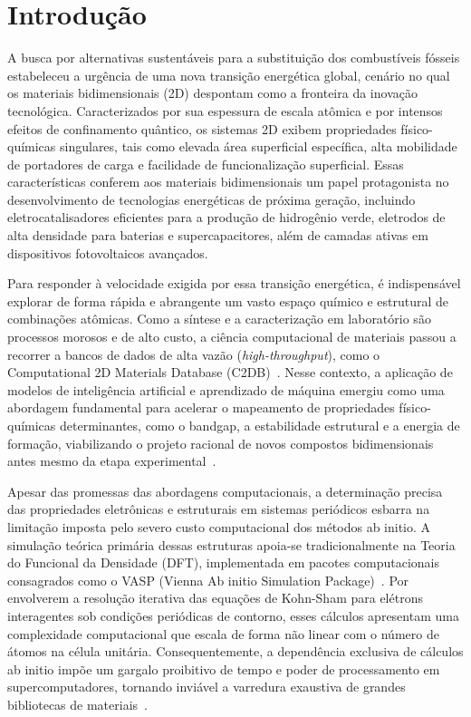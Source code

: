 \chapter{Introdução}



A busca por alternativas sustentáveis para a substituição dos combustíveis fósseis estabeleceu a urgência de uma nova transição energética global, cenário no qual os materiais bidimensionais (2D) despontam como a fronteira da inovação tecnológica. Caracterizados por sua espessura de escala atômica e por intensos efeitos de confinamento quântico, os sistemas 2D exibem propriedades físico-químicas singulares, tais como elevada área superficial específica, alta mobilidade de portadores de carga e facilidade de funcionalização superficial. Essas características conferem aos materiais bidimensionais um papel protagonista no desenvolvimento de tecnologias energéticas de próxima geração, incluindo eletrocatalisadores eficientes para a produção de hidrogênio verde, eletrodos de alta densidade para baterias e supercapacitores, além de camadas ativas em dispositivos fotovoltaicos avançados.

Para responder à velocidade exigida por essa transição energética, é indispensável explorar de forma rápida e abrangente um vasto espaço químico e estrutural de combinações atômicas. Como a síntese e a caracterização em laboratório são processos morosos e de alto custo, a ciência computacional de materiais passou a recorrer a bancos de dados de alta vazão (\textit{high-throughput}), como o Computational 2D Materials Database (C2DB)~\cite{haastrup2018computational}. Nesse contexto, a aplicação de modelos de inteligência artificial e aprendizado de máquina emergiu como uma abordagem fundamental para acelerar o mapeamento de propriedades físico-químicas determinantes, como o bandgap, a estabilidade estrutural e a energia de formação, viabilizando o projeto racional de novos compostos bidimensionais antes mesmo da etapa experimental~\cite{van2026survey}.

Apesar das promessas das abordagens computacionais, a determinação precisa das propriedades eletrônicas e estruturais em sistemas periódicos esbarra na limitação imposta pelo severo custo computacional dos métodos ab initio. A simulação teórica primária dessas estruturas apoia-se tradicionalmente na Teoria do Funcional da Densidade (DFT), implementada em pacotes computacionais consagrados como o VASP (Vienna Ab initio Simulation Package)~\cite{kresse1996efficient}. Por envolverem a resolução iterativa das equações de Kohn-Sham para elétrons interagentes sob condições periódicas de contorno, esses cálculos apresentam uma complexidade computacional que escala de forma não linear com o número de átomos na célula unitária. Consequentemente, a dependência exclusiva de cálculos ab initio impõe um gargalo proibitivo de tempo e poder de processamento em supercomputadores, tornando inviável a varredura exaustiva de grandes bibliotecas de materiais~\cite{langer2022representations}.

